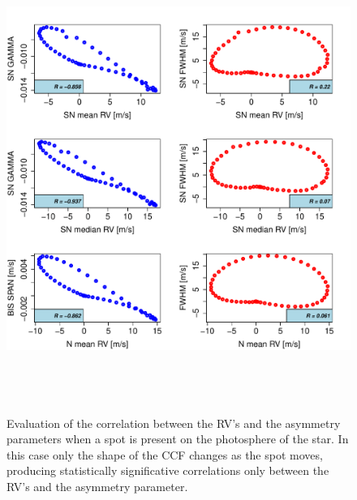 \documentclass{aa}
\begin{document}
\begin{figure}[htbp]
\begin{center}
\includegraphics[height = 6in]{SOAP_SPOT_Comparison_para_SN.pdf} 
   \caption{Evaluation of the correlation between the RV's and the asymmetry parameters when a spot is present on the photosphere of the star. In this case only the shape of the CCF changes as the spot moves, producing statistically significative correlations only between the RV's and the asymmetry parameter.}
    \label{fig:spot.corr}
\end{center}
\end{figure}
\end{document}
